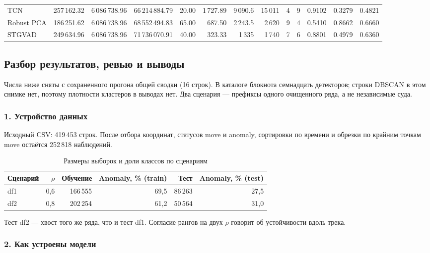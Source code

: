 \documentclass[a4paper,12pt]{report}
\begin{document}
\begin{table}[H]
\begin{tabular}{lrrrrrrrrrrrr}
TCN & 257\,162.32 & 6\,086\,738.96 & 66\,214\,884.79 & 20.00 & 1\,727.89 & 9\,090.6 & 15\,011 & 4 & 9 & 0.9102 & 0.3279 & 0.4821 \\
Robust PCA & 186\,251.62 & 6\,086\,738.96 & 68\,552\,494.83 & 65.00 & 687.50 & 2\,243.5 & 2\,620 & 9 & 4 & 0.5410 & 0.8662 & 0.6660 \\
STGVAD & 249\,634.96 & 6\,086\,738.96 & 71\,736\,070.91 & 40.00 & 323.33 & 1\,335 & 1\,740 & 7 & 6 & 0.8801 & 0.4979 & 0.6360 \\
\bottomrule
\end{tabular}
\end{table}

\subsection{Разбор результатов, ревью и выводы}

Числа ниже сняты с сохраненного прогона общей сводки (16 строк). В каталоге блокнота семнадцать детекторов; строки DBSCAN в этом снимке нет, поэтому плотности кластеров в выводах нет. Два сценария — префиксы одного очищенного ряда, а не независимые суда.

\subsubsection{1. Устройство данных}

Исходный CSV: 419\,453 строк. После отбора координат, статусов move и anomaly, сортировки по времени и обрезки по крайним точкам move остаётся 252\,818 наблюдений.

\begin{table}[H]
\centering
\caption{Размеры выборок и доли классов по сценариям}
\begin{tabular}{lrrrrr}
\toprule
Сценарий & $\rho$ & Обучение & Anomaly, \% (train) & Тест & Anomaly, \% (test) \\
\midrule
df1 & 0{,}6 & 166\,555 & 69{,}5 & 86\,263 & 27{,}5 \\
df2 & 0{,}8 & 202\,254 & 61{,}2 & 50\,564 & 31{,}0 \\
\bottomrule
\end{tabular}
\end{table}

Тест df2 — хвост того же ряда, что и тест df1. Согласие рангов на двух $\rho$ говорит об устойчивости вдоль трека.

\subsubsection{2. Как устроены модели}
\end{document}
